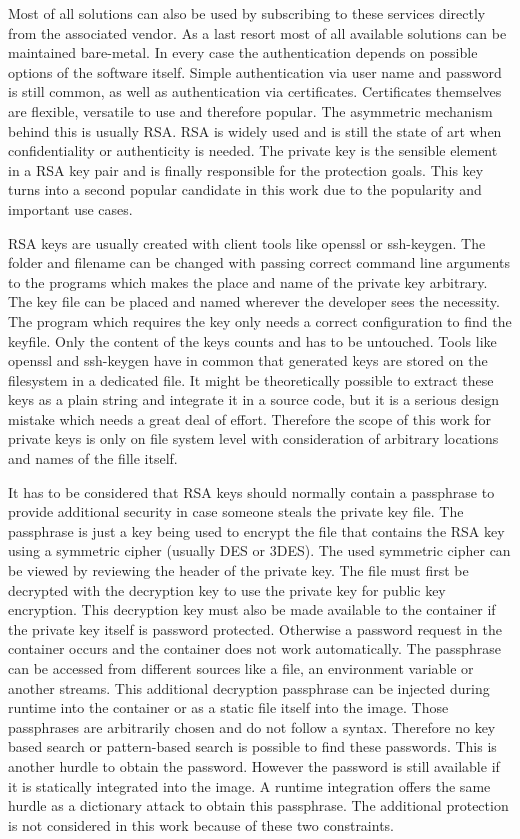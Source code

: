 Most of all solutions can also be used by subscribing to these services directly from the associated vendor.
As a last resort most of all available solutions can be maintained bare-metal.
In every case the authentication depends on possible options of the software itself. 
Simple authentication via user name and password is still common, as well as authentication via certificates.
Certificates themselves are flexible, versatile to use and therefore popular. 
The asymmetric mechanism behind this is usually RSA. 
RSA is widely used and is still the state of art when confidentiality or authenticity is needed. 
The private key is the sensible element in a RSA key pair and is finally responsible for the protection goals.
This key turns into a second popular candidate in this work due to the popularity and important use cases.

RSA keys are usually created with client tools like openssl or ssh-keygen.
The folder and filename can be changed with passing correct command line arguments to the programs which makes the place and name of the private key arbitrary.
The key file can be placed and named wherever the developer sees the necessity. 
The program which requires the key only needs a correct configuration to find the keyfile. 
Only the content of the keys counts and has to be untouched. 
Tools like openssl and ssh-keygen have in common that generated keys are stored on the filesystem in a dedicated file. 
It might be theoretically possible to extract these keys as a plain string and integrate it in a source code, but it is a serious design mistake which needs a great deal of effort. 
Therefore the scope of this work for private keys is only on file system level with consideration of arbitrary locations and names of the fille itself.

It has to be considered that RSA keys should normally contain a passphrase to provide additional security in case someone steals the private key file.
The passphrase is just a key being used to encrypt the file that contains the RSA key using a symmetric cipher (usually DES or 3DES). 
The used symmetric cipher can be viewed by reviewing the header of the private key. 
The file must first be decrypted with the decryption key to use the private key for public key encryption.
This decryption key must also be made available to the container if the private key itself is password protected.
Otherwise a password request in the container occurs and the container does not work automatically.
The passphrase can be accessed from different sources like a file, an environment variable or another streams.
This additional decryption passphrase can be injected during runtime into the container or as a static file itself into the image. 
Those passphrases are arbitrarily chosen and do not follow a syntax.
Therefore no key based search or pattern-based search is possible to find these passwords. 
This is another hurdle to obtain the password. 
However the password is still available if it is statically integrated into the image. 
A runtime integration offers the same hurdle as a dictionary attack to obtain this passphrase.
The additional protection is not considered in this work because of these two constraints.
 
